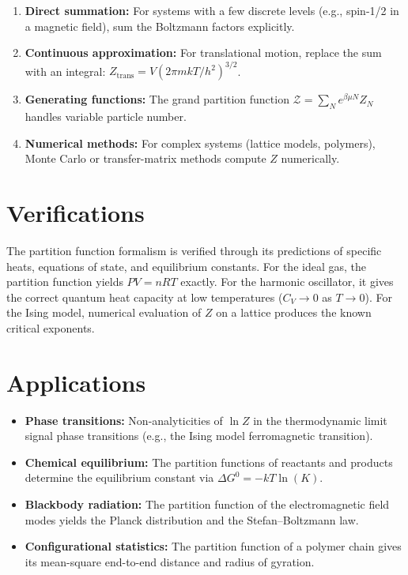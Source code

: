 \begin{enumerate}
  \item \textbf{Direct summation:} For systems with a few discrete levels (e.g., spin-1/2 in a magnetic field), sum the Boltzmann factors explicitly.
  \item \textbf{Continuous approximation:} For translational motion, replace the sum with an integral: $Z_{\text{trans}} = V(2\pi mkT/h^{2})^{3/2}$.
  \item \textbf{Generating functions:} The grand partition function $\mathcal{Z} = \sum_{N} e^{\beta\mu N}Z_{N}$ handles variable particle number.
  \item \textbf{Numerical methods:} For complex systems (lattice models, polymers), Monte Carlo or transfer-matrix methods compute $Z$ numerically.
\end{enumerate}
\section*{Verifications}

The partition function formalism is verified through its predictions of specific heats, equations of state, and equilibrium constants. For the ideal gas, the partition function yields $PV = nRT$ exactly. For the harmonic oscillator, it gives the correct quantum heat capacity at low temperatures ($C_{V} \to 0$ as $T \to 0$). For the Ising model, numerical evaluation of $Z$ on a lattice produces the known critical exponents.
\section*{Applications}

\begin{itemize}
  \item \textbf{Phase transitions:} Non-analyticities of $\ln Z$ in the thermodynamic limit signal phase transitions (e.g., the Ising model ferromagnetic transition).
  \item \textbf{Chemical equilibrium:} The partition functions of reactants and products determine the equilibrium constant via $\Delta G^{0} = -kT\ln(K)$.
  \item \textbf{Blackbody radiation:} The partition function of the electromagnetic field modes yields the Planck distribution and the Stefan--Boltzmann law.
  \item \textbf{Configurational statistics:} The partition function of a polymer chain gives its mean-square end-to-end distance and radius of gyration.
\end{itemize}
